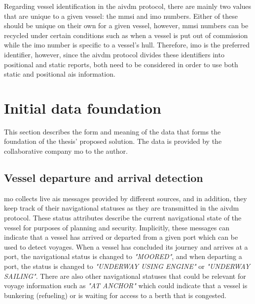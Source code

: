 Regarding vessel identification in the \gls{aivdm} protocol, there are mainly two values that are unique to a given vessel: the \acrshort{mmsi} and \acrshort{imo} numbers. Either of these should be unique on their own for a given vessel, however, \acrshort{mmsi} numbers can be recycled under certain conditions such as when a vessel is put out of commission while the \acrshort{imo} number is specific to a vessel's hull. Therefore, \acrshort{imo} is the preferred identifier, however, since the \gls{aivdm} protocol divides these identifiers into positional and static reports, both need to be considered in order to use both static and positional \acrshort{ais} information.

\section{Initial data foundation}
\label{sec:initial_data_foundation}

This section describes the form and meaning of the data that forms the foundation of the thesis' proposed solution. The data is provided by the collaborative company \acrfull{mo} to the author.

\subsection{Vessel departure and arrival detection}
\label{sec:vessel_transitions}

\acrshort{mo} collects live \acrshort{ais} messages provided by different sources, and in addition, they keep track of their navigational statuses as they are transmitted in the \gls{aivdm} protocol. These status attributes describe the current navigational state of the vessel for purposes of planning and security. Implicitly, these messages can indicate that a vessel has arrived or departed from a given port which can be used to detect voyages. When a vessel has concluded its journey and arrives at a port, the navigational status is changed to \textit{"MOORED"}, and when departing a port, the status is changed to \textit{"UNDERWAY USING ENGINE"} or \textit{"UNDERWAY SAILING"}. There are also other navigational statuses that could be relevant for voyage information such as \textit{"AT ANCHOR"} which could indicate that a vessel is bunkering (refueling) or is waiting for access to a berth that is congested.

